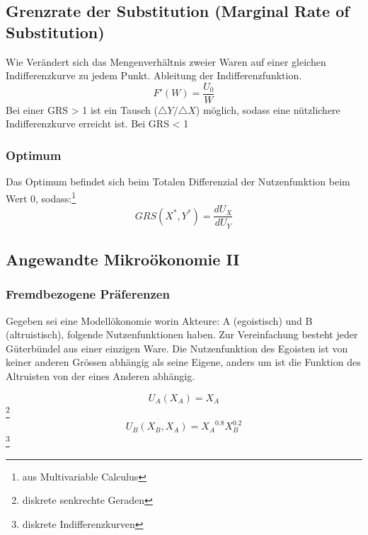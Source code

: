 \subsection{Grenzrate der Substitution (Marginal Rate of Substitution)}

\begin{definition}
    [GRS] Wie Verändert sich das Mengenverhältnis zweier Waren auf einer gleichen Indifferenzkurve zu jedem Punkt. Ableitung der Indifferenzfunktion.
    \begin{equation}
        F'(W) = \frac{U_0}{W}
    \end{equation}
    Bei einer GRS > 1 ist ein Tausch ($\triangle Y / \triangle X$) möglich, sodass eine nützlichere Indifferenzkurve erreicht ist.
    Bei GRS < 1   
\end{definition}

\subsubsection{Optimum}
Das Optimum befindet sich beim Totalen Differenzial der Nutzenfunktion beim Wert 0, sodass:\footnote{aus Multivariable Calculus}
\begin{equation}
    GRS(X^*,Y^*) = \frac{dU_X}{dU_Y}
\end{equation}

\subsection{Angewandte Mikroökonomie II}

\subsubsection{Fremdbezogene Präferenzen}

Gegeben sei eine Modellökonomie worin Akteure: A (egoistisch) und B (altruistisch), folgende Nutzenfunktionen haben. Zur Vereinfachung besteht jeder Güterbündel aus einer einzigen Ware. Die Nutzenfunktion des Egoisten ist von keiner anderen Grössen abhängig als seine Eigene, anders um ist die Funktion des Altruisten von der eines Anderen abhängig.

\begin{equation}
    U_A(X_A) = X_A 
\end{equation}
\footnote{diskrete senkrechte Geraden}
\begin{equation}
    U_B(X_B, X_A)= {X_A}^{0.8}X_B^{0.2} 
\end{equation}
\footnote{diskrete Indifferenzkurven}
\pagebreak
